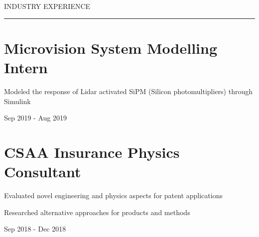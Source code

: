 \documentclass[letterpaper,10pt,oneside]{article}
\begin{document}
\begin{body}
\vspace{3ex}



{
\hspace{-1.72in}\noindent\color{cblue}
{INDUSTRY EXPERIENCE} %
}

\vspace{-1ex}
{\hspace{-1.73in}\noindent\color{dblue}\rule{6.935in}{0.4pt}} %
\vspace{-5ex}


\section
{\textbf{Microvision}
\newline
System Modelling Intern
\newline}


\vspace{-2.5ex}
\begin{detail}
\BulletItem
Modeled the response of Lidar activated SiPM (Silicon photomultipliers) 
\newline
through Simulink

\begin{subtitle}
\vspace{-7.8ex}
{{Sep 2019 - Aug 2019}} 
\end{subtitle}


\section
{\textbf{CSAA Insurance}
\newline
Physics Consultant 
\newline}


\vspace{-2.5ex}
\begin{detail}
\BulletItem
Evaluated novel engineering and physics aspects for patent applications

\BulletItem
Researched alternative approaches for products and methods
\end{detail}

\begin{subtitle}
\vspace{-7.8ex}
{{Sep 2018 - Dec 2018}} 
\end{subtitle}


\end{detail}
\end{body}
\end{document}
